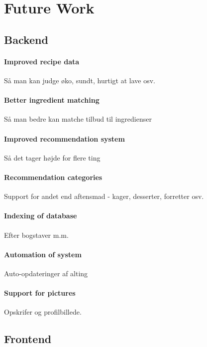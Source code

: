 \section{Future Work}
\label{sec:future}

\subsection{Backend}

\paragraph{Improved recipe data}
Så man kan judge øko, sundt, hurtigt at lave osv.

\paragraph{Better ingredient matching}
Så man bedre kan matche tilbud til ingredienser

\paragraph{Improved recommendation system}
Så det tager højde for flere ting

\paragraph{Recommendation categories}
Support for andet end aftensmad - kager, desserter, forretter osv.

\paragraph{Indexing of database}
Efter bogstaver m.m.

\paragraph{Automation of system}
Auto-opdateringer af alting

\paragraph{Support for pictures}
Opskrifer og profilbillede.

\subsection{Frontend}

